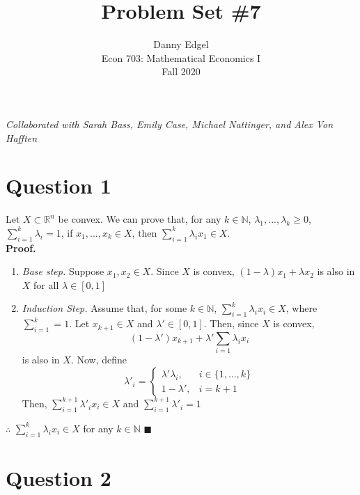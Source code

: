 \documentclass{article}
\newcommand{\N}{\mathbb{N}}
\newcommand{\R}{\mathbb{R}}
\begin{document}
\title{	Problem Set \#7 }
\author{ 	Danny Edgel 							\\ 
			Econ 703: Mathematical Economics I		\\
			Fall 2020								\\
		}
\maketitle\thispagestyle{empty}


\noindent\textit{Collaborated with Sarah Bass, Emily Case, Michael Nattinger, and Alex Von Hafften}


\section*{Question 1}
Let $X\subset\R^n$ be convex. We can prove that, for any $k\in\N$, $\lambda_1,...,\lambda_k\geq 0$, $\sum_{i=1}^k\lambda_i=1$, if ${x_1,...,x_k\in X}$, then ${\sum_{i=1}^k\lambda_ix_1\in X}$.
\medskip \\
\textbf{Proof.}
\begin{enumerate}
	\item \textit{Base step.} Suppose $x_1,x_2\in X$. Since $X$ is convex, $(1-\lambda)x_1 + \lambda x_2$ is also in $X$ for all $\lambda\in[0,1]$
	\item \textit{Induction Step.} Assume that, for some $k\in\N$, $\sum_{i=1}^k\lambda_ix_i\in X$, where $\sum_{i=1}^k=1$. Let $x_{k+1}\in X$ and $\lambda'\in[0,1]$. Then, since $X$ is convex, 
		\[
			(1-\lambda')x_{k+1} + \lambda'\sum_{i=1}\lambda_ix_i
		\]
		is also in $X$. Now, define
		\[
			{\lambda'}_i = \begin{cases} \lambda'\lambda_i, &i\in\{1,...,k\} \\ 1 - \lambda', &i=k+1 \end{cases}
		\]
		Then, $\sum_{i=1}^{k+1}{\lambda'}_ix_i\in X$ and $\sum_{i=1}^{k+1}{\lambda'}_i=1$
\end{enumerate}
$\therefore$ $\sum_{i=1}^k\lambda_ix_i\in X$ for any $k\in\N$ $\blacksquare$

	
\pagebreak
\section*{Question 2}
\end{document}
